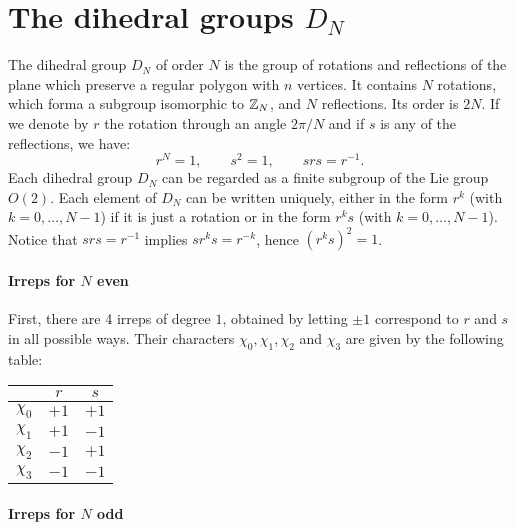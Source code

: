 %
%
\section{The dihedral groups \texorpdfstring{$D_N$}{DN}}
\label{app:the_dihedral_groups}


The dihedral group $D_N$ of order $N$ is the group of rotations and reflections of the plane which preserve a regular polygon with $n$ vertices.
It contains $N$ rotations, which forma a subgroup isomorphic to $\mathbb{Z}_N$, and $N$ reflections.
Its order is $2N$.
If we denote by $r$ the rotation through an angle $2 \pi / N$ and if $s$ is any of the reflections, we have:
\begin{equation}
    r^N = 1, \qquad s^2 = 1, \qquad srs = r^{-1}.
\end{equation}
Each dihedral group $D_N$ can be regarded as a finite subgroup of the Lie group $O(2)$.
Each element of $D_N$ can be written uniquely, either in the form $r^k$ (with $k=0, \dots, N-1$) if it is just a rotation or in the form $r^k s$ (with $k = 0, \dots, N-1$).
Notice that $srs = r^{-1}$ implies $s r^k s = r^{-k}$, hence $(r^k s)^2 = 1$.


\paragraph*{Irreps for $N$ even}

First, there are 4 irreps of degree $1$, obtained by letting $\pm 1$ correspond to $r$ and $s$ in all possible ways.
Their characters $\chi_0, \chi_1, \chi_2$ and $\chi_3$ are given by the following table:

\begin{center}
    \begin{tabular}{ccc}
        \toprule
               & $r$ & $s$ \\
        \midrule
        $\chi_0$ & $+1$ & $+1$ \\
        $\chi_1$ & $+1$ & $-1$ \\
        $\chi_2$ & $-1$ & $+1$ \\
        $\chi_3$ & $-1$ & $-1$ \\
        \bottomrule
    \end{tabular}
\end{center}


\paragraph*{Irreps for $N$ odd}

